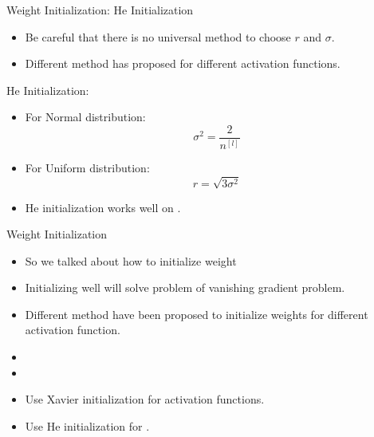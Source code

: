 \begin{frame}{Weight Initialization: He Initialization}
	\begin{itemize}
		\item Be careful that there is no universal method to choose $r$ and $\sigma$.
		\item Different method has proposed for different activation functions.
	\end{itemize}
	\begin{block}{He Initialization:}
		\begin{itemize}
			\item For Normal distribution:
			\[
			\sigma^2 = \frac{2}{n^{[l]}}
			\]
			\item For Uniform distribution:
			\[
			r = \sqrt{3\sigma^2}
			\]
		\end{itemize}
	\end{block}
	\begin{itemize}
		\medskip
		\medskip
		\item He initialization works well on .
	\end{itemize}
\end{frame}

\begin{frame}{Weight Initialization}
	\begin{itemize}
		\item So we talked about how to initialize weight
		\item Initializing well will solve problem of vanishing gradient problem.
		\item Different method have been proposed to initialize weights for different activation function.
		\item[]
		\item[]
		\item Use Xavier initialization for  activation functions.
		\item Use He initialization for .
	\end{itemize}
\end{frame}

